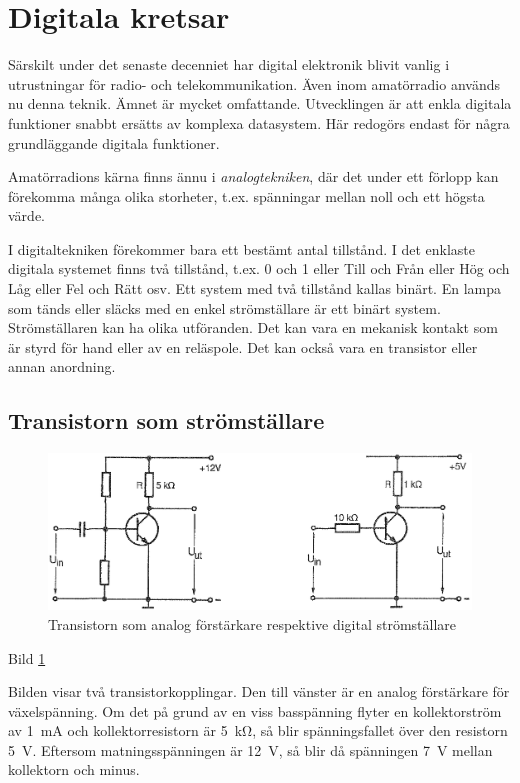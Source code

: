 \section{Digitala kretsar}
\label{digitala kretsar}

Särskilt under det senaste decenniet har digital elektronik blivit vanlig i
utrustningar för radio- och telekommunikation. Även inom amatörradio används nu
denna teknik. Ämnet är mycket omfattande. Utvecklingen är att enkla digitala
funktioner snabbt ersätts av komplexa datasystem. Här redogörs endast för några
grundläggande digitala funktioner.

Amatörradions kärna finns ännu i \emph{analogtekniken}, där det under ett
förlopp kan förekomma många olika storheter, t.ex. spänningar mellan noll och
ett högsta värde.

I digitaltekniken förekommer bara ett bestämt antal tillstånd. I det enklaste
digitala systemet finns två tillstånd, t.ex. 0 och 1 eller Till och Från eller
Hög och Låg eller Fel och Rätt osv. Ett system med två tillstånd kallas
binärt. En lampa som tänds eller släcks med en enkel strömställare är ett binärt
system. Strömställaren kan ha olika utföranden. Det kan vara en mekanisk kontakt
som är styrd för hand eller av en reläspole. Det kan också vara en transistor
eller annan anordning.

\subsection{Transistorn som strömställare}

\begin{figure}
\includegraphics[width=\textwidth]{images/bild_2_2-35.png}
\caption{Transistorn som analog förstärkare respektive digital strömställare}
\label{fig:BildII2-35}
\end{figure}

Bild \ref{fig:BildII2-35}

Bilden visar två transistorkopplingar. Den till vänster är en analog förstärkare
för växelspänning. Om det på grund av en viss basspänning flyter en
kollektorström av 1~mA och kollektorresistorn är 5~kΩ, så blir spänningsfallet
över den resistorn 5~V. Eftersom matningsspänningen är 12~V, så blir då
spänningen 7~V mellan kollektorn och minus.

